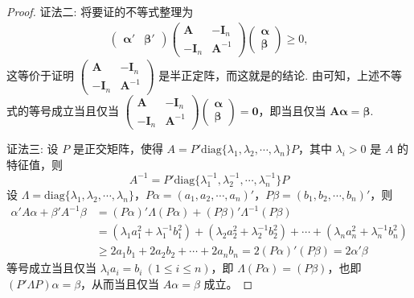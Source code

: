 \documentclass[../../main.tex]{subfiles}
\begin{document}
\begin{proof}
{\color{blue}证法二:}
将要证的不等式整理为
\begin{align*}
\begin{pmatrix}
\boldsymbol{\alpha}' & \boldsymbol{\beta}'
\end{pmatrix}
\begin{pmatrix}
\boldsymbol{A} & -\boldsymbol{I}_n \\
-\boldsymbol{I}_n & \boldsymbol{A}^{-1}
\end{pmatrix}
\begin{pmatrix}
\boldsymbol{\alpha} \\
\boldsymbol{\beta}
\end{pmatrix} \geq 0,
\end{align*}
这等价于证明 $\begin{pmatrix}
\boldsymbol{A} & -\boldsymbol{I}_n \\
-\boldsymbol{I}_n & \boldsymbol{A}^{-1}
\end{pmatrix}$ 是半正定阵，而这就是的结论. 由可知，上述不等式的等号成立当且仅当 $\begin{pmatrix}
\boldsymbol{A} & -\boldsymbol{I}_n \\
-\boldsymbol{I}_n & \boldsymbol{A}^{-1}
\end{pmatrix}
\begin{pmatrix}
\boldsymbol{\alpha} \\
\boldsymbol{\beta}
\end{pmatrix}=\boldsymbol{0}$，即当且仅当 $\boldsymbol{A}\boldsymbol{\alpha}=\boldsymbol{\beta}$.

{\color{blue}证法三:}
设 \(P\) 是正交矩阵，使得 \(A = P'\mathrm{diag}\{\lambda_1,\lambda_2,\cdots,\lambda_n\}P\)，其中 \(\lambda_i > 0\) 是 \(A\) 的特征值，则
\[
A^{-1} = P'\mathrm{diag}\{\lambda_1^{-1},\lambda_2^{-1},\cdots,\lambda_n^{-1}\}P
\]
设 \(\Lambda = \mathrm{diag}\{\lambda_1,\lambda_2,\cdots,\lambda_n\}\)，\(P\alpha = (a_1,a_2,\cdots,a_n)'\)，\(P\beta = (b_1,b_2,\cdots,b_n)'\)，则
\begin{align*}
\alpha'A\alpha + \beta'A^{-1}\beta &= (P\alpha)'\Lambda(P\alpha) + (P\beta)'\Lambda^{-1}(P\beta)\\
&= (\lambda_1a_1^2 + \lambda_1^{-1}b_1^2) + (\lambda_2a_2^2 + \lambda_2^{-1}b_2^2) + \cdots + (\lambda_na_n^2 + \lambda_n^{-1}b_n^2)\\
&\geq 2a_1b_1 + 2a_2b_2 + \cdots + 2a_nb_n = 2(P\alpha)'(P\beta) = 2\alpha'\beta
\end{align*}
等号成立当且仅当 \(\lambda_ia_i = b_i\ (1\leq i \leq n)\)，即 \(\Lambda(P\alpha) = (P\beta)\)，也即 \((P'\Lambda P)\alpha = \beta\)，从而当且仅当 \(A\alpha = \beta\) 成立。 
\end{proof}
\end{document}
